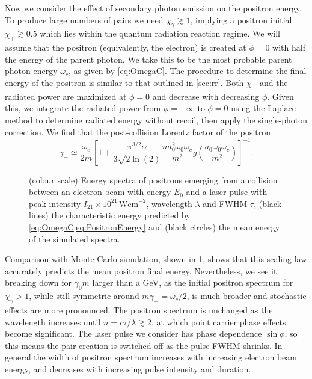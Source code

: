 \documentclass[reprint,superscriptaddress,amsmath,amssymb,aps,pra]{revtex4-1}
\newcommand{\Wcm}{\mathrm{Wcm}}
\newcommand{\lnTwo}{\ln(2)}
\begin{document}
Now we consider the effect of secondary photon emission on the positron
energy. To produce large numbers of pairs we need $\chi_\gamma \gtrsim 1$,
implying a positron initial $\chi_+ \gtrsim 0.5$ which lies within the
quantum radiation reaction regime. We will assume that the positron (equivalently,
the electron) is created at $\phi = 0$ with half the energy of the parent photon.
We take this to be the most probable parent photon energy $\omega_c$, as
given by \cref{eq:OmegaC}. The procedure to determine the final energy of
the positron is similar to that outlined in \cref{sec:rr}. Both $\chi_+$ and
the radiated power are maximized at $\phi = 0$ and decrease with decreasing $\phi$.
Given this, we integrate the radiated power from $\phi = -\infty$ to
$\phi = 0$ using the Laplace method to determine radiated energy without recoil,
then apply the single-photon correction. We find that the post-collision Lorentz
factor of the positron
	\begin{equation}
	\gamma_{+} \simeq
		\frac{\omega_c}{2m}
		\left[
		1 +
			\frac{\pi^{3/2}\alpha}{3 \sqrt{2\lnTwo}}
			\frac{n a_0^2 \omega_0 \omega_c}{m^2}
			g\!\left(\frac{a_0 \omega_0 \omega_c}{m^2}\right)
		\right]^{-1}.
	\label{eq:PositronEnergy}
	\end{equation}

	\begin{figure}
	\subfloat[]{}
	\subfloat[]{}
	\subfloat[]{}
	\caption[Positron spectra]
			{(colour scale) Energy spectra of positrons emerging from a collision
			between an electron
			beam with energy $E_0$ and a laser pulse with peak intensity
			$I_{21}\times10^{21}\,\Wcm^{-2}$, wavelength $\lambda$ and FWHM $\tau$,
			(black lines) the characteristic energy predicted by
			\cref{eq:OmegaC,eq:PositronEnergy} and (black circles) the mean
			energy of the simulated spectra.}
	\label{fig:PositronSpectra}
	\end{figure}

Comparison with Monte Carlo simulation, shown in \cref{fig:PositronSpectra},
shows that this scaling law accurately predicts the mean positron final energy.
Nevertheless, we see it breaking down for $\gamma_0 m$ larger than a GeV, as the initial positron
spectrum for $\chi_\gamma > 1$, while still symmetric around $m\gamma_+ =
\omega_c/2$, is much broader and stochastic effects are more pronounced.
The positron spectrum is unchanged as the wavelength increases until 
$n = c \tau / \lambda \gtrsim 2$, at which point carrier phase effects
become significant. The laser pulse we consider has phase dependence
$\sin\phi$, so this means the pair creation is switched off as the pulse
FWHM shrinks. In general the width of positron spectrum increases with
increasing electron beam energy, and decreases with increasing pulse
intensity and duration.
\end{document}
